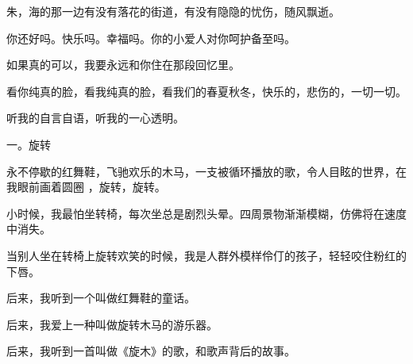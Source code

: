 \documentclass[12pt,a4paper]{article}
\def\blankrev{\vspace{1ex}}									%
\newcommand{\subpart}[1]{
	\begingroup \par
	\vspace{1ex} \centering #1
	\par \endgroup
}
\begin{document}
		朱，海的那一边有没有落花的街道，有没有隐隐的忧伤，随风飘逝。

		你还好吗。快乐吗。幸福吗。你的小爱人对你呵护备至吗。

		如果真的可以，我要永远和你住在那段回忆里。

		看你纯真的脸，看我纯真的脸，看我们的春夏秋冬，快乐的，悲伤的，一切一切。

	\endwriting




		听我的自言自语，听我的一心透明。


		\subpart{一。旋转}

		永不停歇的红舞鞋，飞驰欢乐的木马，一支被循环播放的歌，令人目眩的世界，在我眼前画着圆圈
	，旋转，旋转。

		小时候，我最怕坐转椅，每次坐总是剧烈头晕。四周景物渐渐模糊，仿佛将在速度中消失。\par
		当别人坐在转椅上旋转欢笑的时候，我是人群外模样伶仃的孩子，轻轻咬住粉红的下唇。

		\blankrev
		后来，我听到一个叫做红舞鞋的童话。\par
		后来，我爱上一种叫做旋转木马的游乐器。\par
		后来，我听到一首叫做《旋木》的歌，和歌声背后的故事。
\end{document}
